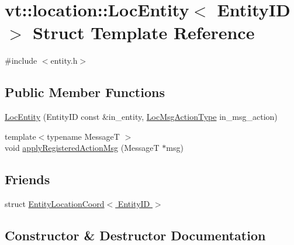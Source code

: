 \hypertarget{structvt_1_1location_1_1_loc_entity}{}\section{vt\+:\+:location\+:\+:Loc\+Entity$<$ Entity\+ID $>$ Struct Template Reference}
\label{structvt_1_1location_1_1_loc_entity}


{\ttfamily \#include $<$entity.\+h$>$}

\subsection*{Public Member Functions}
\begin{DoxyCompactItemize}
\item 
\hyperlink{structvt_1_1location_1_1_loc_entity_a41d90430d63f4e299e1c888fcf9d3238}{Loc\+Entity} (Entity\+ID const \&in\+\_\+entity, \hyperlink{namespacevt_1_1location_ad0a130e4d79e745543925240e13e8f08}{Loc\+Msg\+Action\+Type} in\+\_\+msg\+\_\+action)
\item 
{\footnotesize template$<$typename MessageT $>$ }\\void \hyperlink{structvt_1_1location_1_1_loc_entity_a7675dd0ee13bc5b759b6a4313d521e04}{apply\+Registered\+Action\+Msg} (MessageT $\ast$msg)
\end{DoxyCompactItemize}
\subsection*{Friends}
\begin{DoxyCompactItemize}
\item 
struct \hyperlink{structvt_1_1location_1_1_loc_entity_abf8115ee4795af8b482a657aa6195a6a}{Entity\+Location\+Coord$<$ Entity\+I\+D $>$}
\end{DoxyCompactItemize}


\subsection{Constructor \& Destructor Documentation}
\mbox{\label{structvt_1_1location_1_1_loc_entity_a41d90430d63f4e299e1c888fcf9d3238}} 
